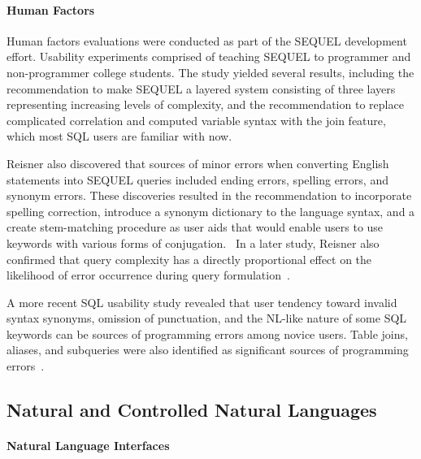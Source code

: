 \paragraph{\textbf{Human Factors}}
Human factors evaluations were conducted as part of the SEQUEL development effort. Usability experiments comprised of teaching SEQUEL to programmer and non-programmer college students. The study yielded several results, including the recommendation to make SEQUEL a layered system consisting of three layers representing increasing levels of complexity, and the recommendation to replace complicated correlation and computed variable syntax with the join feature, which most SQL users are familiar with now.

Reisner also discovered that sources of minor errors when converting English statements into SEQUEL queries included ending errors, spelling errors, and synonym errors. These discoveries resulted in the recommendation to incorporate spelling correction, introduce a synonym dictionary to the language syntax, and a create stem-matching procedure as user aids that would enable users to use keywords with various forms of conjugation.~\cite{Reisner1977} In a later study, Reisner also confirmed that query complexity has a directly proportional effect on the likelihood of error occurrence during query formulation~\cite{Reisner1975}.

A more recent SQL usability study revealed that user tendency toward invalid syntax synonyms, omission of punctuation, and the NL-like nature of some SQL keywords can be sources of programming errors among novice users. Table joins, aliases, and subqueries were also identified as significant sources of programming errors~\cite{10.1145/3514214}.

\subsection{Natural and Controlled Natural Languages}

\paragraph{Natural Language Interfaces}

